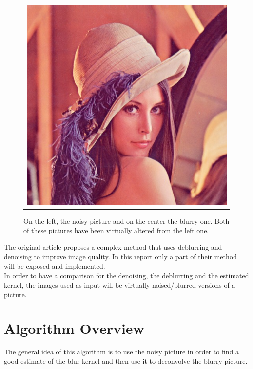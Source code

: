 \documentclass{article}
\begin{document}
\begin{figure}[ht]
\begin{center}
\begin{tabular}{c}
		\includegraphics[scale=0.28]{images/lena.jpg}
	\end{tabular}
	\caption{On the left, the noisy picture and on the center the blurry one. Both of these pictures have been virtually altered from the left one.}
	\label{intro}
\end{center}
\end{figure}

The original article \cite{deblur_denoise} proposes a complex method that uses deblurring and denoising to improve image quality. In this report only a part of their method will be exposed and implemented.\\
In order to have a comparison for the denoising, the deblurring and the estimated kernel, the images used as input will be virtually noised/blurred versions of a picture.

\newpage

\section{Algorithm Overview}

The general idea of this algorithm is to use the noisy picture in order to find a good estimate of the blur kernel and then use it to deconvolve the blurry picture.\\
\end{document}
